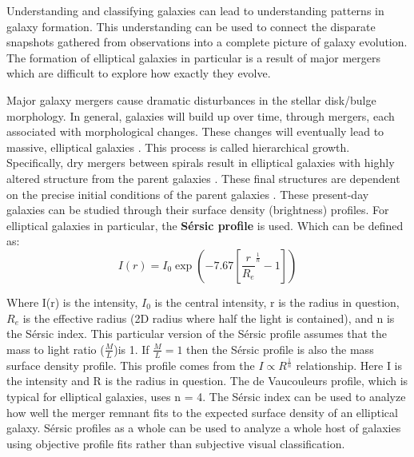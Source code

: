 \documentclass[fleqn,usenatbib]{mnras}
\begin{document}
Understanding and classifying galaxies can lead to understanding patterns in galaxy formation. This understanding can be used to connect the disparate snapshots gathered from observations into a complete picture of galaxy evolution. The formation of elliptical galaxies in particular is a result of major mergers which are difficult to explore how exactly they evolve. %

Major galaxy mergers cause dramatic disturbances in the stellar disk/bulge morphology. In general, galaxies will build up over time, through mergers, each associated with morphological changes. These changes will eventually lead to massive, elliptical galaxies \citep{Duc2013}. This process is called hierarchical growth.
Specifically, dry mergers between spirals result in elliptical galaxies with highly altered structure from the parent galaxies \citep{Aceves2006}. These final structures are dependent on the precise initial conditions of the parent galaxies \citep{Querejeta2014}.
These present-day galaxies can be studied through their surface density (brightness) profiles. For elliptical galaxies in particular, the \textbf{S\'ersic profile} is used. Which can be defined as:
\begin{equation}
    I(r) = I_0\exp(-7.67[\frac{r}{R_e}^\frac{1}{n}-1])
    \label{eq:sErsic}
\end{equation}

Where I(r) is the intensity, $I_0$ is the central intensity, r is the radius in question, $R_e$ is the effective radius (2D radius where half the light is contained), and n is the S\'ersic index. This particular version of the S\'ersic profile assumes that the mass to light ratio ($\frac{M}{L}$)is 1. If $\frac{M}{L} = 1$  then the S\'ersic profile is also the mass surface density profile. 
This profile comes from the $I \propto R^{\frac{1}{n}}$ relationship. Here I is the intensity and R is the radius in question. The de Vaucouleurs profile, which is typical for elliptical galaxies, uses n = 4. 
The S\'ersic index can be used to analyze how well the merger remnant fits to the expected surface density of an elliptical galaxy. S\'ersic profiles as a whole can be used to analyze a whole host of galaxies using objective profile fits rather than subjective visual classification.
\end{document}
